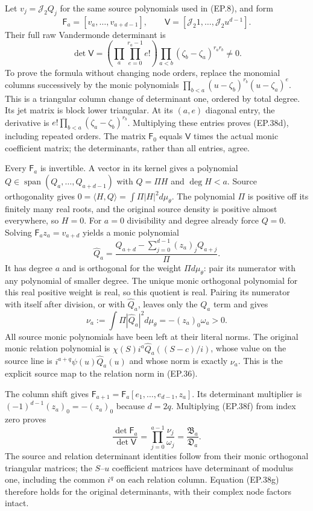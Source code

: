 Let $v_j=\mathcal J_2Q_j$ for the same source polynomials used in
(EP.8), and form
\[
 \mathsf F_a=[v_a,\ldots,v_{a+d-1}],\qquad
 \mathsf V=[\mathcal J_2 1,\ldots,\mathcal J_2u^{d-1}].
\tag{EP.38c}
\]
Their full raw Vandermonde determinant is
\[
 \det\mathsf V=
 \left(\prod_a\prod_{e=0}^{r_a-1}e!\right)
 \prod_{a<b}(\zeta_b-\zeta_a)^{r_ar_b}\ne0.\tag{EP.38d}
\]
To prove the formula without changing node orders, replace the monomial
columns successively by the monic polynomials
$\prod_{b<a}(u-\zeta_b)^{r_b}(u-\zeta_a)^e$.
This is a triangular column change of determinant one, ordered by
total degree. Its jet matrix is block lower triangular. At its
$(a,e)$ diagonal entry, the derivative is
$e!\prod_{b<a}(\zeta_a-\zeta_b)^{r_b}$.
Multiplying these entries proves (EP.38d), including repeated orders.
The matrix $\mathsf F_0$ equals $\mathsf V$ times the actual monic
coefficient matrix; the determinants, rather than all entries, agree.

Every $\mathsf F_a$ is invertible. A vector in its kernel gives a
polynomial $Q\in\operatorname{span}(Q_a,\ldots,Q_{a+d-1})$
with $Q=\Pi H$ and $\deg H<a$. Source orthogonality gives
$0=\langle H,Q\rangle=\int\Pi|H|^2d\mu_\theta$.
The polynomial $\Pi$ is positive off its finitely many real roots,
and the original source density is positive almost everywhere, so
$H=0$. For $a=0$ divisibility and degree already
force $Q=0$. Solving $\mathsf F_a z_a=v_{a+d}$ yields a monic
polynomial
\[
 \widehat Q_a=
 \frac{Q_{a+d}-\sum_{j=0}^{d-1}(z_a)_jQ_{a+j}}{\Pi}.
\tag{EP.38e}
\]
It has degree $a$ and is orthogonal for the weight $\Pi d\mu_\theta$:
pair its numerator with any polynomial of smaller degree. The unique
monic orthogonal polynomial for this real positive weight is real,
so this quotient is real. Pairing its numerator with itself after
division, or with $\widehat Q_a$, leaves only the $Q_a$ term and gives
\[
 \nu_a:=\int\Pi|\widehat Q_a|^2d\mu_\theta
 =-(z_a)_0\omega_a>0.\tag{EP.38f}
\]
All source monic polynomials have been left at their literal norms.
The original monic relation polynomial is
$\chi(S)i^a\widehat Q_a((S-c)/i)$, whose value on the source line
is $i^{a+q}\psi(u)\widehat Q_a(u)$ and whose norm is exactly $\nu_a$.
This is the explicit source map to the relation norm in (EP.36).

The column shift gives
$\mathsf F_{a+1}=\mathsf F_a[e_1,\ldots,e_{d-1},z_a]$.
Its determinant multiplier is $(-1)^{d-1}(z_a)_0=-(z_a)_0$
because $d=2q$. Multiplying (EP.38f) from index zero proves
\[
 \boxed{\frac{\det\mathsf F_a}{\det\mathsf V}
 =\prod_{j=0}^{a-1}\frac{\nu_j}{\omega_j}
 =\frac{\mathfrak B_a}{\mathfrak D_a}.}\tag{EP.38g}
\]
The source and relation determinant identities follow from their
monic orthogonal triangular matrices; the $S$--$u$ coefficient
matrices have determinant of modulus one, including the common
$i^q$ on each relation column. Equation (EP.38g) therefore holds
for the original determinants, with their complex node factors intact.


